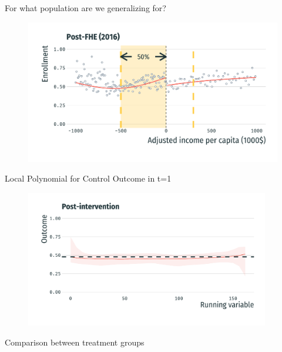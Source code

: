 \documentclass[usenames,dvipsnames,11pt,aspectratio=169]{beamer}
\begin{document}
\begin{frame}{For what population are we generalizing for?}
\begin{figure}[!htb]
\centering
    \includegraphics[width=\textwidth]{figures/fhe_post_bw_coverv2.pdf}
\end{figure}
\end{frame}

\begin{frame}{Local Polynomial for Control Outcome in t=1}
\begin{figure}[!htb]
\centering
    \includegraphics[width=0.95\textwidth]{figures/test_y1.pdf}
\end{figure}
\end{frame}


\begin{frame}{Comparison between treatment groups}
\begin{table}[!htb]
\centering
\scalebox{0.8}{
    
    }
\end{table}
\end{frame}
\end{document}
